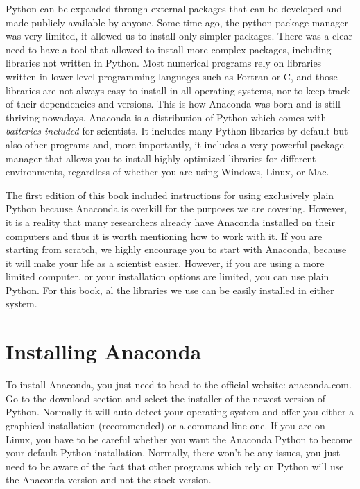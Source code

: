 Python can be expanded through external packages that can be developed and made publicly available by anyone. Some time ago, the python package manager was very limited, it allowed us to install only simpler packages. There was a clear need to have a tool that allowed to install more complex packages, including libraries not written in Python. Most numerical programs rely on libraries written in lower-level programming languages such as Fortran or C, and those libraries are not always easy to install in all operating systems, nor to keep track of their dependencies and versions. This is how Anaconda was born and is still thriving nowadays. Anaconda is a distribution of Python which comes with \emph{batteries included} for scientists. It includes many Python libraries by default but also other programs and, more importantly, it includes a very powerful package manager that allows you to install highly optimized libraries for different environments, regardless of whether you are using Windows, Linux, or Mac. 

The first edition of this book included instructions for using exclusively plain Python because Anaconda is overkill for the purposes we are covering. However, it is a reality that many researchers already have Anaconda installed on their computers and thus it is worth mentioning how to work with it. If you are starting from scratch, we highly encourage you to start with Anaconda, because it will make your life as a scientist easier. However, if you are using a more limited computer, or your installation options are limited, you can use plain Python. For this book, al the libraries we use can be easily installed in either system. 

\section{Installing Anaconda}
To install Anaconda, you just need to head to the official website: anaconda.com. Go to the download section and select the installer of the newest version of Python. Normally it will auto-detect your operating system and offer you either a graphical installation (recommended) or a command-line one. If you are on Linux, you have to be careful whether you want the Anaconda Python to become your default Python installation. Normally, there won't be any issues, you just need to be aware of the fact that other programs which rely on Python will use the Anaconda version and not the stock version. 


